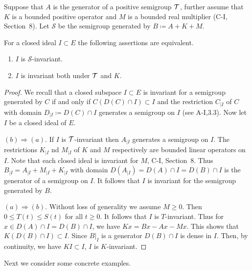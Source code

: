 \begin{proposition}\label{prop:c3-3.3}
	Suppose that $A$ is the generator of a positive semigroup $\mathcal{T}$, further assume that $K$ is a bounded positive operator and $M$ is a bounded real multiplier (\cf C-I, Section~8).
	Let $\mathcal{S}$ be the semigroup generated by $B \coloneqq A + K + M$.
	
	For a closed ideal $I \subset E$ the following assertions are equivalent.
	\begin{enumerate}[\upshape (a)]
		\item 
		$I$ is $\mathcal{S}$-invariant.
	
		\item 
		$I$ is invariant both under $\mathcal{T}$ and $K$.
	\end{enumerate}
\end{proposition}
\begin{proof}
We recall that a closed subspace $I \subset E$ is invariant for a semigroup generated by $C$ if and only if $C(D(C)\cap I) \subset I$ and the restriction $C_{|I}$ of $C$ with domain $D_{|I} \coloneqq D(C)\cap I$ generates a semigroup on $I$ (see A-I,3.3).
Now let $I$ be a closed ideal of $E$.

$(b)\Rightarrow (a)$.
If $I$ is $\mathcal{T}$-invariant then $A_{|I}$ generates a semigroup on $I$.
The restrictions $K_{|I}$ nd $M_{|I}$ of $K$ and $M$ respectively are bounded linear operators on $I$.
Note that each closed ideal is invariant for $M$, \cf C-I, Section~8.
Thus $B_{|I} = A_{|I} + M_{|I} + K_{|I}$ with domain $D(A_{|I}) = D(A)\cap I = D(B)\cap I$ is the generator of a semigroup on $I$.
It follows that $I$ is invariant for the semigroup generated by $B$.

$(a) \Rightarrow (b)$.
Without loss of generality we assume $M \geq 0$.
Then $0 \leq T(t) \leq S(t)$ for all $t \geq 0$.
It follows that $I$ is $T$-invariant.
Thus for $x \in D(A)\cap I = D(B)\cap I$, we have $Kx = Bx - Ax - Mx$.
This shows that $K(D(B)\cap I) \subset I$.
Since $B|_{I}$ is a generator $D(B)\cap I$ is dense in $I$.
Then, by continuity, we have $KI \subset I$, \ie  $I$ is $K$-invariant.
\end{proof}

Next we consider some concrete examples.

